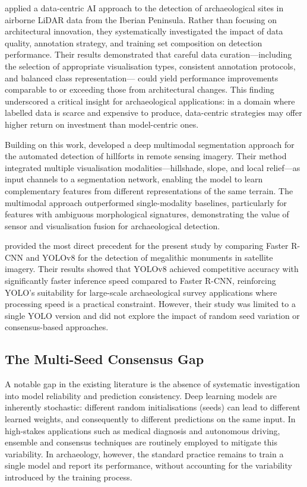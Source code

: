 \documentclass[12pt,a4paper]{article}
\begin{document}
\citet{canedo2023uncovering} applied a data-centric AI approach to the detection of
archaeological sites in airborne LiDAR data from the Iberian Peninsula. Rather than
focusing on architectural innovation, they systematically investigated the impact of data
quality, annotation strategy, and training set composition on detection performance. Their
results demonstrated that careful data curation---including the selection of appropriate
visualisation types, consistent annotation protocols, and balanced class representation---
could yield performance improvements comparable to or exceeding those from architectural
changes. This finding underscored a critical insight for archaeological applications: in a
domain where labelled data is scarce and expensive to produce, data-centric strategies may
offer higher return on investment than model-centric ones.

Building on this work, \citet{canedo2025automated} developed a deep multimodal segmentation
approach for the automated detection of hillforts in remote sensing imagery. Their method
integrated multiple visualisation modalities---hillshade, slope, and local relief---as
input channels to a segmentation network, enabling the model to learn complementary
features from different representations of the same terrain. The multimodal approach
outperformed single-modality baselines, particularly for features with ambiguous
morphological signatures, demonstrating the value of sensor and visualisation fusion for
archaeological detection.

\citet{marccal2024evaluating} provided the most direct precedent for the present study by
comparing Faster R-CNN and YOLOv8 for the detection of megalithic monuments in satellite
imagery. Their results showed that YOLOv8 achieved competitive accuracy with significantly
faster inference speed compared to Faster R-CNN, reinforcing YOLO's suitability for
large-scale archaeological survey applications where processing speed is a practical
constraint. However, their study was limited to a single YOLO version and did not explore
the impact of random seed variation or consensus-based approaches.

\subsection{The Multi-Seed Consensus Gap}

A notable gap in the existing literature is the absence of systematic investigation into
model reliability and prediction consistency. Deep learning models are inherently stochastic:
different random initialisations (seeds) can lead to different learned weights, and
consequently to different predictions on the same input. In high-stakes applications such
as medical diagnosis and autonomous driving, ensemble and consensus techniques are
routinely employed to mitigate this variability. In archaeology, however, the standard
practice remains to train a single model and report its performance, without accounting for
the variability introduced by the training process.
\end{document}
